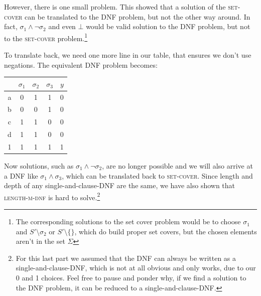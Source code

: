 \documentclass{article}
\begin{document}
However, there is one small problem. This showed that a solution of the \textsc{set-cover} can be translated to the DNF problem, but not the other way around.
In fact, $\sigma_1 \land \lnot\sigma_2$ and even $\bot$ would be valid solution to the DNF problem, but not to the \textsc{set-cover} problem.\footnote{The corresponding solutions to the set cover problem would be to choose $\sigma_1$ and $S'\setminus\sigma_2$ or $S'\setminus\{\}$, which do build proper set covers, but the chosen elements aren't in the set $\Sigma$}

To translate back, we need one more line in our table, that ensures we don't use negations.  The equivalent DNF problem becomes:


\begin{center}
    \begin{tabular}{c || c c c | c}
          & $\sigma_1$ & $\sigma_2$ & $\sigma_3$ & $y$ \\
        \hline
        \hline
        a & 0 & 1 & 1 & 0 \\
        b & 0 & 0 & 1 & 0 \\
        c & 1 & 1 & 0 & 0 \\
        d & 1 & 1 & 0 & 0 \\
        1 & 1 & 1 & 1 & 1
    \end{tabular}
\end{center}

Now solutions, such as $\sigma_1 \land \lnot\sigma_2$, are no longer possible and we will also arrive at a DNF like $\sigma_1 \land \sigma_3$, which can be translated back to \textsc{set-cover}. Since length and depth of any single-and-clause-DNF are the same, we have also shown that \textsc{length-m-dnf} is hard to solve.\footnote{For this last part we assumed that the DNF can always be written as a single-and-clause-DNF, which is not at all obvious and only works, due to our 0 and 1 choices. Feel free to pause and ponder why, if we find a solution to the DNF problem, it can be reduced to a single-and-clause-DNF.}
\end{document}
